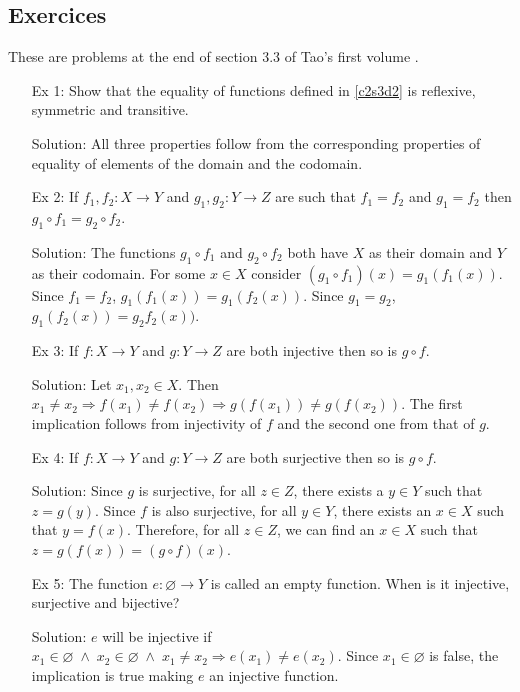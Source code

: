 \subsection{Exercices}
These are problems at the end of section 3.3 of Tao's first volume
\cite{tao2014a1}.
\begin{enumerate}
\item[Ex 1:] Show that the equality of functions defined in \ref{c2s3d2}
is reflexive, symmetric and transitive.
\item[Solution:] All three properties follow from the corresponding 
properties of equality of elements of the domain and the codomain.

\item[Ex 2:] If $f_1, f_2: X \rightarrow Y$ and $g_1, g_2: Y \rightarrow
Z$ are such that $f_1 = f_2$ and $g_1 = f_2$ then $g_1 \circ f_1 = g_2
\circ f_2$.
\item[Solution:] The functions $g_1 \circ f_1$ and $g_2 \circ f_2$ both
have $X$ as their domain and $Y$ as their codomain. For some $x \in X$
consider $(g_1 \circ f_1)(x) = g_1(f_1(x))$. Since $f_1 = f_2$, 
$g_1(f_1(x)) = g_1(f_2(x))$. Since $g_1 = g_2$, $g_1(f_2(x)) = g_2f_2(x))$.

\item[Ex 3:] If $f: X \rightarrow Y$ and $g: Y \rightarrow Z$ are both
injective then so is $g \circ f$.
\item[Solution:] Let $x_1, x_2 \in X$. Then $x_1 \ne x_2 \Rightarrow
f(x_1) \ne f(x_2) \Rightarrow g(f(x_1)) \ne g(f(x_2))$. The first 
implication follows from injectivity of $f$ and the second one from that of
$g$.

\item[Ex 4:] If $f: X \rightarrow Y$ and $g: Y \rightarrow Z$ are both
surjective then so is $g \circ f$.
\item[Solution:] Since $g$ is surjective, for all $z \in Z$, there exists
a $y \in Y$ such that $z = g(y)$. Since $f$ is also surjective, for all $y
\in Y$, there exists an $x \in X$ such that $y = f(x)$. Therefore, for all
$z \in Z$, we can find an $x \in X$ such that $z = g(f(x)) = (g \circ f)(x)
$.

\item[Ex 5:] The function $e: \varnothing \rightarrow Y$ is called an
empty function. When is it injective, surjective and bijective?
\item[Solution:] $e$ will be injective if $x_1 \in \varnothing \;\land\;
x_2 \in \varnothing \;\land\; x_1 \ne x_2 \Rightarrow e(x_1)
\ne e(x_2)$. Since $x_1 \in \varnothing$ is false, the implication is true
making $e$ an injective function.


\end{enumerate}
